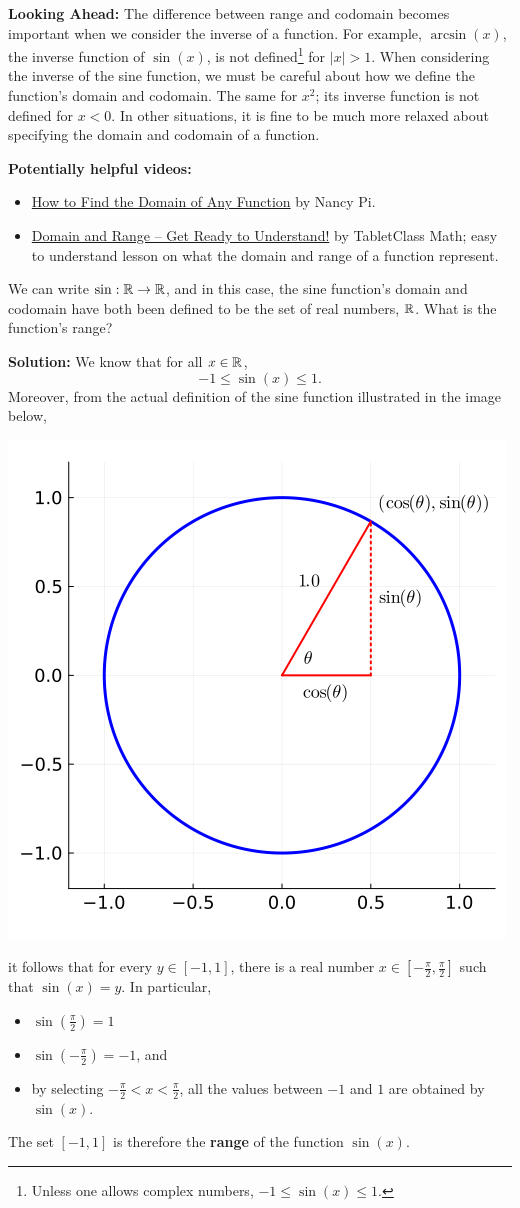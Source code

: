 \bigskip

\textbf{Looking Ahead:} The difference between range and codomain becomes important when we consider the inverse of a function. For example, $\arcsin(x)$, the inverse function of $\sin(x)$, is not defined\footnote{Unless one allows complex numbers, $-1 \le \sin(x) \le 1$.} for $|x|>1$. When considering the inverse of the sine function, we must be careful about how we define the function's domain and codomain. The same for $x^2$; its inverse function is not defined for $x < 0$. In other situations, it is fine to be much more relaxed about specifying the domain and codomain of a function.

\bigskip
\textbf{Potentially helpful videos:}
\begin{itemize}
    \item \href{https://youtu.be/GQGFMUfr10M}{How to Find the Domain of Any Function} by Nancy Pi.
    \item \href{https://youtu.be/uH3jFrTkWis}{Domain and Range – Get Ready to Understand!} by TabletClass Math; easy to understand lesson on what the domain and range of a function represent.  
\end{itemize}



\begin{example}
We can write $\sin: \mathbb R \to \mathbb R$, and in this case, the sine function's domain and codomain have both been defined to be the set of real numbers, $\mathbb R$. What is the function's range?
\end{example}

\textbf{Solution:}  We know that for all $x\in \mathbb R$,
$$ -1 \le \sin(x) \le 1.$$ Moreover, from the actual definition of the sine function illustrated in the image below,
\begin{center}
    \includegraphics[width=0.50\columnwidth]{graphics/Chap01/defSineCosineUnitCircle.png}%
\end{center}
it follows that for every $ y \in [-1, 1]$, there is a real number $x \in [-\frac{\pi}{2}, \frac{\pi}{2}] $ such that $\sin(x) = y$. In particular,
\begin{itemize}
    \item $\sin(\frac{\pi}{2}) = 1$
    \item  $\sin(-\frac{\pi}{2}) = -1$, and 
    \item by selecting $ -\frac{\pi}{2} < x < \frac{\pi}{2}$, all the values between $-1$
 and $1$ are obtained by $\sin(x)$.
 \end{itemize}
The set $[-1, 1]$ is therefore the \textbf{range} of the function $\sin(x)$. 


